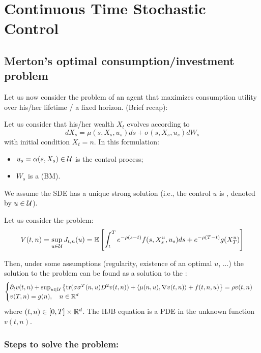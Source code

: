 \section{Continuous Time Stochastic Control}

\subsection{Merton's optimal consumption/investment problem}

Let us now consider the problem of an agent that maximizes consumption utility over his/her lifetime / a fixed horizon. (Brief recap):

Let us consider that his/her wealth $X_t$ evolves according to
\begin{equation*}
    dX_s = \mu(s, X_s, u_s) ds + \sigma(s, X_s, u_s) dW_s
\end{equation*}
with initial condition $X_t = n$. In this formulation:
\begin{itemize}
    \item $u_s = \alpha(s, X_s) \in \mathcal{U}$ is the control process;
    \item $W_s$ is a  (BM).
\end{itemize}

We assume the SDE has a unique strong solution (i.e., the control $u$ is , denoted by $u \in \mathcal{U}$).

Let us consider the problem:
\begin{equation*}
    V(t,n) = \sup_{u \in \mathcal{U}} J_{t,n}(u) = \mathbb E \left[ \int_t^T e^{-\rho(s-t)} f(s, X_s^u, u_s) ds + e^{-\rho(T-t)} g(X_T^u) \right]
\end{equation*}

Then, under some assumptions (regularity, existence of an optimal $u$, ...) the solution to the problem can be found as a solution to the :
\begin{equation}
    \begin{cases}
        \partial_t v(t,n) + \sup_{u \in \mathcal{U}} \left\{ \operatorname{tr}(\sigma \sigma^T(n,u) D^2 v(t,n)) + \langle \mu(n,u), \nabla v(t,n) \rangle + f(t,n,u) \right\} = \rho v(t,n) \\
        v(T,n) = g(n), \quad n \in \mathbb R^d
    \end{cases}
\end{equation}
where $(t,n) \in [0,T] \times \mathbb R^d$. The HJB equation is a PDE in the unknown function $v(t,n)$.

\subsubsection{Steps to solve the problem:}

